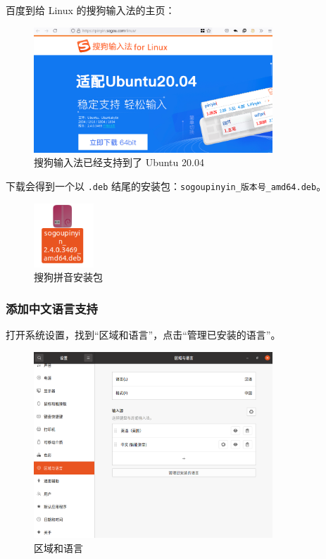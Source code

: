 \documentclass[UTF-8]{ctexart}
\begin{document}
			百度到给 Linux 的搜狗输入法的主页：
		
			\begin{figure}[H]
				\centering
				\includegraphics[width=0.8\textwidth]{fig/sogou.png}
				\caption*{搜狗输入法已经支持到了 Ubuntu 20.04}
			\end{figure}
	
			下载会得到一个以 \texttt{.deb} 结尾的安装包：\texttt{sogoupinyin\_版本号\_amd64.deb}。
			
			\begin{figure}[H]
				\centering
				\includegraphics[width=0.2\textwidth]{fig/sogoupinyin_deb.png}
				\caption*{搜狗拼音安装包}
			\end{figure}
			
			\subsubsection{添加中文语言支持}
			
				打开系统设置，找到“区域和语言”，点击“管理已安装的语言”。
				
				\begin{figure}[H]
					\centering
					\includegraphics[width=0.8\textwidth]{fig/settings_locs_and_langs.png}
					\caption*{区域和语言}
				\end{figure}
			
\end{document}
